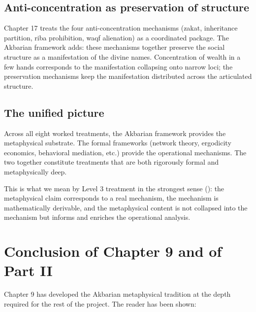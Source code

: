 \subsection{Anti-concentration as preservation of structure}

Chapter 17 treats the four anti-concentration mechanisms (zakat,
inheritance partition, riba prohibition, waqf alienation) as a
coordinated package. The Akbarian framework adds: these mechanisms
together preserve the social structure as a manifestation of the
divine names. Concentration of wealth in a few hands corresponds to
the manifestation collapsing onto narrow loci; the preservation
mechanisms keep the manifestation distributed across the
articulated structure.

\subsection{The unified picture}

Across all eight worked treatments, the Akbarian framework provides
the metaphysical substrate. The formal frameworks (network theory,
ergodicity economics, behavioral mediation, etc.) provide the
operational mechanisms. The two together constitute treatments that
are both rigorously formal and metaphysically deep.

This is what we mean by Level 3 treatment in the strongest sense
(): the metaphysical claim corresponds to
a real mechanism, the mechanism is mathematically derivable, and
the metaphysical content is not collapsed into the mechanism but
informs and enriches the operational analysis.

\section{Conclusion of Chapter 9 and of Part II}

Chapter 9 has developed the Akbarian metaphysical tradition at the
depth required for the rest of the project. The reader has been
shown:

